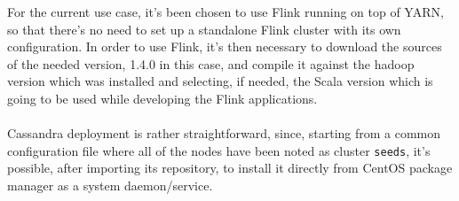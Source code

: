 For the current use case, it's been chosen to use Flink running on top of YARN, so that there's no need to set up a standalone Flink cluster with its own configuration. In order to use Flink, it's then necessary to download the sources of the needed version, 1.4.0 in this case, and compile it against the hadoop version which was installed and selecting, if needed, the Scala version which is going to be used while developing the Flink applications.\\
\\
Cassandra deployment is rather straightforward, since, starting from a common \texttt{} configuration file where all of the nodes have been noted as cluster \texttt{seeds}, it's possible, after importing its repository, to install it directly from CentOS package manager as a system daemon/service.
